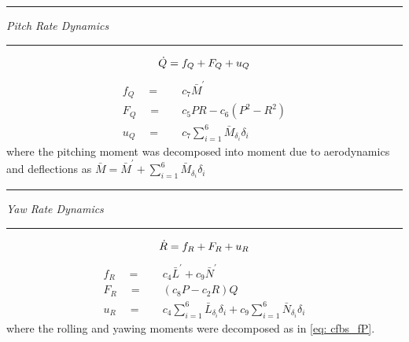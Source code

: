 \documentclass[12pt]{ucthesis}
\begin{document}
\begin{center} {\color{lightgray}\rule[2pt]{2.25in}{1pt}} \noindent \textit{Pitch Rate Dynamics} {\color{lightgray}\rule[2pt]{2.25in}{1pt}}  \end{center}
	\begin{equation}
		\dot{Q} = f_Q + F_Q + u_Q \\
		\label{eq: cfbs_qdot}
	\end{equation}
	\begin{align}
		\label{eq: cfbs_fQ} f_Q \quad =& \quad c_7 \bar{M}^{'}\\
		\label{eq: cfbs_FQ} F_Q \quad =& \quad c_5 PR - c_6 \left( P^2 - R^2\right)\\
		\label{eq: cfbs_uQ} u_Q \quad =& \quad c_7 \sum\limits_{i=1}^6 \bar{M}_{\delta_i} \delta_i
	\end{align}
where the pitching moment was decomposed into moment due to aerodynamics and deflections as  $\bar{M} = \bar{M}^{'} + \sum_{i=1}^6 \bar{M}_{\delta_i} \delta_i$

\begin{center} {\color{lightgray}\rule[2pt]{2.25in}{1pt}} \noindent \textit{Yaw Rate Dynamics} {\color{lightgray}\rule[2pt]{2.25in}{1pt}}  \end{center}
	\begin{equation}
		\dot{R} = f_R + F_R + u_R \\
		\label{eq: cfbs_rdot}
	\end{equation}
	\begin{align}
		\label{eq: cfbs_fR} f_R \quad =& \quad 	c_4 \bar{L}^{'} + c_9 \bar{N}^{'}\\
		\label{eq: cfbs_FR} F_R \quad =& \quad 	\left( c_8 P - c_2 R \right) Q\\
		\label{eq: cfbs_uR} u_R \quad =& \quad 	c_4 \sum\limits_{i=1}^6 \bar{L}_{\delta_i} \delta_i + c_9 \sum\limits_{i=1}^6 \bar{N}_{\delta_i} \delta_i
	\end{align}
where the rolling and yawing moments were decomposed as in \autoref{eq: cfbs_fP}.
\end{document}
